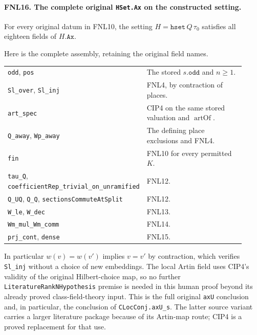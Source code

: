 \documentclass[11pt,a4paper]{article}
\numberwithin{equation}{section}
\theoremstyle{remark}\newtheorem{remark}[theorem]{Remark}
\begin{document}
\paragraph{FNL16. The complete original \texttt{HSet.\allowbreak Ax} on the constructed setting.}
\label{claim:FNL16}
For every original datum in FNL10, the setting
\(H=\texttt{hset}\,\allowbreak{} Q\,\tau_0\) satisfies all eighteen fields of
\(H.\texttt{Ax}\).

Here is the complete assembly, retaining the original field names.
\begin{center}\small
\begin{tabular}{p{0.43\linewidth}p{0.49\linewidth}}
\texttt{odd}, \texttt{pos} & The stored \(s.\texttt{odd}\) and \(n\ge1\).\\
\texttt{Sl\_\allowbreak over}, \texttt{Sl\_\allowbreak inj} & FNL4, by contraction of places.\\
\texttt{art\_\allowbreak spec} & CIP4 on the same stored valuation and \(\operatorname{artOf}\).\\
\texttt{Q\_\allowbreak away}, \texttt{Wp\_\allowbreak away} & The defining place exclusions and FNL4.\\
\texttt{fin} & FNL10 for every permitted \(K\).\\
\texttt{tau\_\allowbreak Q}, \texttt{coefficient\allowbreak Rep\_\allowbreak trivial\_\allowbreak on\_\allowbreak unramified} & FNL12.\\
\texttt{Q\_\allowbreak UQ}, \texttt{Q\_\allowbreak Q}, \texttt{sections\allowbreak Commute\allowbreak At\allowbreak Split} & FNL12.\\
\texttt{W\_\allowbreak le}, \texttt{W\_\allowbreak dec} & FNL13.\\
\texttt{Wm\_\allowbreak mul\_\allowbreak Wm\_\allowbreak comm} & FNL14.\\
\texttt{prj\_\allowbreak cont}, \texttt{dense} & FNL15.
\end{tabular}
\end{center}
In particular \(w(v)=w(v')\) implies \(v=v'\) by contraction,
which verifies \texttt{Sl\_\allowbreak inj} without a choice of new embeddings.
The local Artin field uses CIP4's validity of the original Hilbert-choice
map, so no further \texttt{Literature\allowbreak Rank\allowbreak NHypothesis} premise is needed
in this human proof beyond its already proved class-field-theory input.
This is the full original \texttt{ax\allowbreak U} conclusion and, in particular,
the conclusion of \texttt{CLoc\allowbreak Conj.\allowbreak ax\allowbreak U\_\allowbreak s}.  The latter source variant
carries a larger literature package because of its Artin-map route;
CIP4 is a proved replacement for that use.
\end{document}

